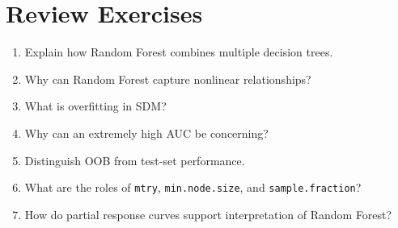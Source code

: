 \section{Review Exercises}
\begin{enumerate}
  \item Explain how Random Forest combines multiple decision trees.
  \item Why can Random Forest capture nonlinear relationships?
  \item What is overfitting in SDM?
  \item Why can an extremely high AUC be concerning?
  \item Distinguish OOB from test-set performance.
  \item What are the roles of \texttt{mtry}, \texttt{min.node.size}, and \texttt{sample.fraction}?
  \item How do partial response curves support interpretation of Random Forest?
\end{enumerate}
